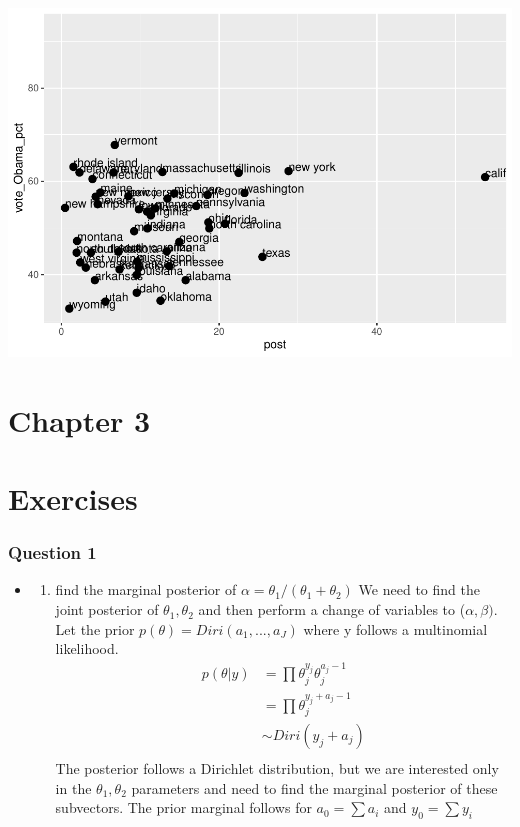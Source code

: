 \documentclass[
]{book}
\providecommand{\tightlist}{%
  \setlength{\itemsep}{0pt}\setlength{\parskip}{0pt}}
\theoremstyle{definition}
\theoremstyle{definition}
\theoremstyle{definition}
\theoremstyle{definition}
\theoremstyle{remark}
\begin{document}
\includegraphics{_main_files/figure-latex/unnamed-chunk-29-3.pdf}

\hypertarget{chapter-3}{%
\chapter{Chapter 3}\label{chapter-3}}

\hypertarget{exercises-2}{%
\chapter*{Exercises}\label{exercises-2}}

\hypertarget{question-1-1}{%
\subsection*{Question 1}\label{question-1-1}}

\begin{itemize}
\item
  \begin{enumerate}
  \def\labelenumi{(\alph{enumi})}
  \tightlist
  \item
    find the marginal posterior of \(\alpha = \theta_1/(\theta_1+\theta_2)\)
    We need to find the joint posterior of \(\theta_1, \theta_2\) and then perform a change of variables to (\(\alpha,\beta)\). Let the prior \(p(\theta)=Diri(a_1,...,a_J)\) where y follows a multinomial likelihood.
    \[
    \begin{aligned}
    p(\theta | y) &= \prod \theta_j^{y_j}\theta_j^{a_j-1}\\
    &= \prod \theta_j^{y_j+a_j-1}\\
    & \sim Diri(y_j+a_j)\\
    \end{aligned}
    \]
    The posterior follows a Dirichlet distribution, but we are interested only in the \(\theta_1,\theta_2\) parameters and need to find the marginal posterior of these subvectors. The prior marginal follows for \(a_0= \sum a_i\) and \(y_0= \sum y_i\)
  \end{enumerate}
\end{itemize}
\end{document}
